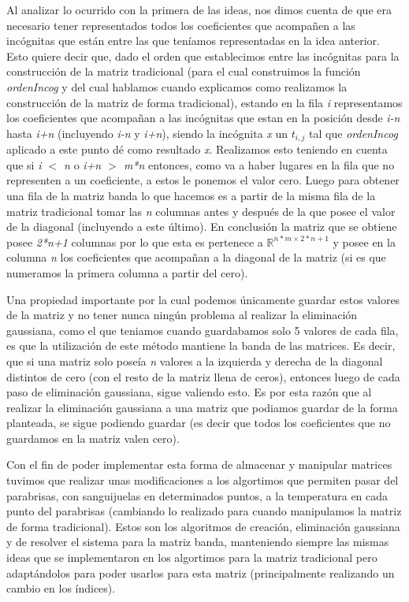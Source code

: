 \documentclass[10pt, a4paper]{article}
\begin{document}
Al analizar lo ocurrido con la primera de las ideas, nos dimos cuenta de que era necesario tener representados todos los coeficientes que acompañen a las inc\'ognitas que est\'an entre las que ten\'iamos representadas en la idea anterior. Esto quiere decir que, dado el orden que establecimos entre las inc\'ognitas para la construcci\'on de la matriz tradicional (para el cual construimos la funci\'on \textit{ordenIncog} y del cual hablamos cuando explicamos como realizamos la construcci\'on de la matriz de forma tradicional), estando en la fila \textit{i} representamos los coeficientes que acompañan a las inc\'ognitas que estan en la posici\'on desde \textit{i-n} hasta \textit{i+n} (incluyendo \textit{i-n} y \textit{i+n}), siendo la inc\'ognita \textit{x} un \textit{$t_{i,j}$} tal que \textit{ordenIncog} aplicado a este punto d\'e como resultado \textit{x}. Realizamos esto teniendo en cuenta que si \textit{i $<$ n} o \textit{i+n $>$ m*n} entonces, como va a haber lugares en la fila que no representen a un coeficiente, a estos le ponemos el valor cero. Luego para obtener una fila de la matriz banda lo que hacemos es a partir de la misma fila de la matriz tradicional tomar las \textit{n} columnas antes y despu\'es de la que posee el valor de la diagonal (incluyendo a este \'ultimo). En conclusi\'on la matriz que se obtiene posee \textit{2*n+1} columnas por lo que esta es pertenece a $\mathbb{R}^{n*m\times 2*n+1}$ y posee en la columna \textit{n} los coeficientes que acompañan a la diagonal de la matriz (si es que numeramos la primera columna a partir del cero).

Una propiedad importante por la cual podemos \'unicamente guardar estos valores de la matriz y no tener nunca ning\'un problema al realizar la eliminaci\'on gaussiana, como el que teniamos cuando guardabamos solo 5 valores de cada fila, es que la utilizaci\'on de este m\'etodo mantiene la banda de las matrices. Es decir, que si una matriz solo pose\'ia \textit{n} valores a la izquierda y derecha de la diagonal distintos de cero (con el resto de la matriz llena de ceros), entonces luego de cada paso de eliminaci\'on gaussiana, sigue valiendo esto. Es por esta raz\'on que al realizar la eliminaci\'on gaussiana a una matriz que podiamos guardar de la forma planteada, se sigue podiendo guardar (es decir que todos los coeficientes que no guardamos en la matriz valen cero).

Con el fin de poder implementar esta forma de almacenar y manipular matrices tuvimos que realizar unas modificaciones a los algortimos que permiten pasar del parabrisas, con sanguijuelas en determinados puntos, a la temperatura en cada punto del parabrisas (cambiando lo realizado para cuando manipulamos la matriz de forma tradicional). Estos son los algoritmos de creaci\'on, eliminaci\'on gaussiana y de resolver el sistema para la matriz banda, manteniendo siempre las mismas ideas que se implementaron en los algortimos para la matriz tradicional pero adapt\'andolos para poder usarlos para esta matriz (principalmente realizando un cambio en los \'indices).
\end{document}
